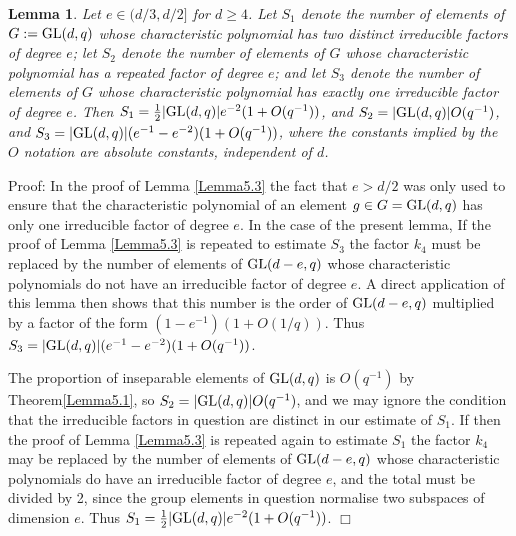 \documentclass[12pt]{article}
\newtheorem{lemma}[definition]{Lemma}
\newenvironment{proof}{\normalsize {\sc Proof}:}{{\hfill $\Box$ \\}}
\def\GL{{\rm GL}}
\begin{document}
\begin{lemma}\label{Lemma5.4} Let $e\in(d/3,d/2]$ for $d \geq 4$.
Let $S_1$ denote the number of elements of $G:=\GL(d,q)$ whose characteristic polynomial
has two distinct irreducible factors of degree $e$; let $S_2$ denote the number
of elements of $G$ whose characteristic polynomial has a repeated factor of
degree $e$; and let $S_3$ denote the number of elements of $G$ whose characteristic
polynomial has exactly one irreducible factor of degree $e$. 
Then $S_1={1\over2}\vert\GL(d,q)\vert e^{-2}(1+O(q^{-1}))$, and 
$S_2=\vert\GL(d,q)\vert O(q^{-1})$, 
and $S_3=\vert\GL(d,q)\vert(e^{-1}-e^{-2})(1+O(q^{-1}))$,
where the constants implied by the $O$ notation are absolute constants,
independent of $d$.
\end{lemma}
\begin{proof}  In the proof of Lemma \ref{Lemma5.3} the fact 
that $e>d/2$ was only used
to ensure that the characteristic polynomial of an element $g\in G=\GL(d,q)$ has 
only one irreducible factor of degree $e$.  In the case of the present lemma,
 If the proof of 
Lemma \ref{Lemma5.3} is repeated to estimate $S_3$ the
factor $k_4$ must be replaced by the number of elements of $\GL(d-e,q)$ whose
characteristic polynomials do not have an irreducible factor of degree $e$. A
direct application of this lemma then shows that this number is the order
of $\GL(d-e,q)$ multiplied by a factor of the form $(1-e^{-1})(1+O(1/q))$.
Thus $S_3=\vert\GL(d,q)\vert(e^{-1}-e^{-2})(1+O(q^{-1}))$. 

The proportion of inseparable elements of $\GL(d,q)$ is
$O(q^{-1})$ by Theorem\ref{Lemma5.1}, so $S_2=\vert\GL(d,q)\vert O(q^{-1})$,
and we may ignore the condition that the irreducible factors in question are
distinct in our estimate of $S_1$.
 If then the proof of
Lemma \ref{Lemma5.3} is repeated again to estimate $S_1$ the factor $k_4$ may
be replaced by the number of elements of $\GL(d-e,q)$ whose characteristic
polynomials do have an irreducible factor of degree $e$, and the total
must be divided by 2, since the group elements in question normalise
two subspaces of dimension $e$.  
Thus $S_1={1\over2}\vert\GL(d,q)\vert e^{-2}(1+O(q^{-1}))$.  
\end{proof}
\end{document}
